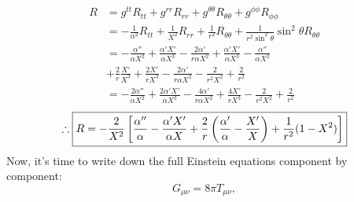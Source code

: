 \documentclass[12pt]{report}
\begin{document}
	\begin{align*}
		R &= g^{tt}R_{tt} + g^{rr}R_{rr} + g^{\theta\theta}R_{\theta\theta} + g^{\phi\phi}R_{\phi\phi}\\
		&
		= -\frac{1}{\alpha^2}R_{tt} + \frac{1}{X^2}R_{rr} + \frac{1}{r^2}R_{\theta\theta} + \frac{1}{r^2\sin^2\theta}\sin^2\theta R_{\theta\theta} \\
		&= -\frac{\alpha''}{\alpha X^2} + \frac{\alpha'X'}{\alpha X^3} - \frac{2\alpha'}{r\alpha X^2} + \frac{\alpha'X'}{\alpha X^3} - \frac{\alpha''}{\alpha X^2}\\
		&
		+ \frac{2}{r}\frac{X'}{X^3} + \frac{2X'}{rX^3} - \frac{2\alpha'}{r\alpha X^2} - \frac{2}{r^2X^2} + \frac{2}{r^2} \\
		&= -\frac{2\alpha''}{\alpha X^2} + \frac{2\alpha'X'}{\alpha X^3} - \frac{4\alpha'}{r\alpha X^2} + \frac{4X'}{rX^3} - \frac{2}{r^2X^2} + \frac{2}{r^2}
	\end{align*}
	\begin{equation}
		\therefore \boxed{R= -\frac{2}{X^2}\left[\frac{\alpha''}{\alpha} - \frac{\alpha'X'}{\alpha X} + \frac{2}{r}\left(\frac{\alpha'}{\alpha} - \frac{X'}{X}\right) + \frac{1}{r^2}(1-X^2)\right]}\\
	\end{equation}
	Now, it's time to write down the full Einstein equations component by component:
	\begin{equation}
		G_{\mu\nu} = 8\pi T_{\mu\nu},
	\end{equation}
	
\end{document}
